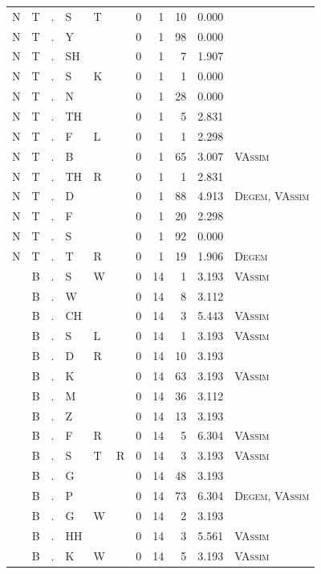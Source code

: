 \documentclass[12pt]{article}
\begin{document}
\begin{longtable}{r@{ } r@{ } c@{ } l@{ } l@{ } l@{ } r r r r l }
N & T & . & S & T &  & 0 & 1 & 10 & 0.000 &  \\
N & T & . & Y &  &  & 0 & 1 & 98 & 0.000 &  \\
N & T & . & SH &  &  & 0 & 1 & 7 & 1.907 &  \\
N & T & . & S & K &  & 0 & 1 & 1 & 0.000 &  \\
N & T & . & N &  &  & 0 & 1 & 28 & 0.000 &  \\
N & T & . & TH &  &  & 0 & 1 & 5 & 2.831 &  \\
N & T & . & F & L &  & 0 & 1 & 1 & 2.298 &  \\
N & T & . & B &  &  & 0 & 1 & 65 & 3.007 & \textsc{VAssim} \\
N & T & . & TH & R &  & 0 & 1 & 1 & 2.831 &  \\
N & T & . & D &  &  & 0 & 1 & 88 & 4.913 & \textsc{Degem}, \textsc{VAssim} \\
N & T & . & F &  &  & 0 & 1 & 20 & 2.298 &  \\
N & T & . & S &  &  & 0 & 1 & 92 & 0.000 &  \\
N & T & . & T & R &  & 0 & 1 & 19 & 1.906 & \textsc{Degem} \\
 & B & . & S & W &  & 0 & 14 & 1 & 3.193 & \textsc{VAssim} \\
 & B & . & W &  &  & 0 & 14 & 8 & 3.112 &  \\
 & B & . & CH &  &  & 0 & 14 & 3 & 5.443 & \textsc{VAssim} \\
 & B & . & S & L &  & 0 & 14 & 1 & 3.193 & \textsc{VAssim} \\
 & B & . & D & R &  & 0 & 14 & 10 & 3.193 &  \\
 & B & . & K &  &  & 0 & 14 & 63 & 3.193 & \textsc{VAssim} \\
 & B & . & M &  &  & 0 & 14 & 36 & 3.112 &  \\
 & B & . & Z &  &  & 0 & 14 & 13 & 3.193 &  \\
 & B & . & F & R &  & 0 & 14 & 5 & 6.304 & \textsc{VAssim} \\
 & B & . & S & T & R & 0 & 14 & 3 & 3.193 & \textsc{VAssim} \\
 & B & . & G &  &  & 0 & 14 & 48 & 3.193 &  \\
 & B & . & P &  &  & 0 & 14 & 73 & 6.304 & \textsc{Degem}, \textsc{VAssim} \\
 & B & . & G & W &  & 0 & 14 & 2 & 3.193 &  \\
 & B & . & HH &  &  & 0 & 14 & 3 & 5.561 & \textsc{VAssim} \\
 & B & . & K & W &  & 0 & 14 & 5 & 3.193 & \textsc{VAssim} \\

\end{longtable}
\end{document}
